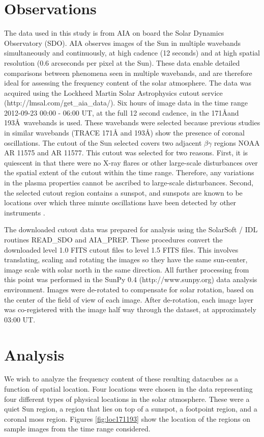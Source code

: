 \documentclass[onecolumn]{emulateapj}
\begin{document}
\section{Observations}\label{sec:obs}
The data used in this study is from AIA on board the Solar Dynamics
Observatory (SDO).  AIA observes images of the Sun in multiple
wavebands simultaneously and continuously, at high cadence (12
seconds) and at high spatial resolution (0.6 arcseconds per pixel at
the Sun).  These data enable detailed comparisons between phenomena
seen in multiple wavebands, and are therefore ideal for assessing the
frequency content of the solar atmosphere.  The data was acquired
using the Lockheed Martin Solar Astrophysics cutout service
(http://lmsal.com/get\_aia\_data/).  Six hours of image data in the
time range 2012-09-23 00:00 - 06:00 UT, at the full 12 second cadence,
in the 171\AA and 193\AA\ wavebands is used.  These wavebands were
selected because previous studies in similar wavebands (TRACE 171\AA
and 193\AA) show the presence of coronal oscillations.  The cutout of
the Sun selected covers two adjacent $\beta\gamma$ regions NOAA AR
11575 and AR 11577.  This cutout was selected for two reasons.  First,
it is quiescent in that there were no X-ray flares or other
large-scale disturbances over the spatial extent of the cutout within
the time range.  Therefore, any variations in the plasma properties
cannot be ascribed to large-scale disturbances.  Second, the selected
cutout region contains a sunspot, and sunspots are known to be
locations over which three minute oscillations have been detected by
other instruments \citep{2002A&A...387L..13D}.

The downloaded cutout data was prepared for analysis using the
SolarSoft / IDL routines READ\_SDO and AIA\_PREP.  These procedures
convert the downloaded level 1.0 FITS cutout files to level 1.5 FITS
files.  This involves translating, scaling and rotating the images so
they have the same sun-center, image scale with solar north in the
same direction.  All further processing from this point was performed
in the SunPy 0.4 (http://www.sunpy.org) data analysis environment.
Images were de-rotated to compensate for solar rotation, based on the
center of the field of view of each image.  After de-rotation, each
image layer was co-registered with the image half way through the
dataset, at approximately 03:00 UT.

\section{Analysis}\label{sec:anal}
We wish to analyze the frequency content of these resulting datacubes
as a function of spatial location.  Four locations were chosen in the
data representing four different types of physical locations in the
solar atmosphere.  These were a quiet Sun region, a region that lies
on top of a sunspot, a footpoint region, and a coronal moss region.
Figures \ref{fig:loc171193} show the location of the regions on sample
images from the time range considered.
\end{document}
